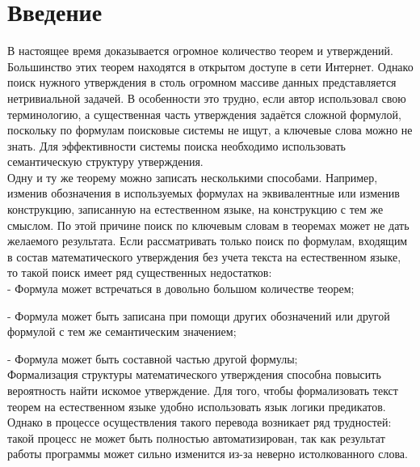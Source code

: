 \documentclass[12pt]{article}
\begin{document}

\newpage
\begin{center}
\tableofcontents \vspace{3cm}
\end{center}



\newpage

\section*{Введение}
В настоящее время доказывается огромное количество теорем и утверждений. Большинство этих теорем  находятся в открытом доступе в сети Интернет. Однако поиск нужного утверждения в столь огромном массиве данных представляется нетривиальной задачей. В особенности это трудно, если автор использовал свою терминологию, а существенная часть утверждения задаётся сложной формулой, поскольку по формулам поисковые системы не ищут, а ключевые слова можно не знать. Для эффективности системы поиска необходимо использовать семантическую структуру утверждения. \\

Одну и ту же теорему можно записать несколькими способами. Например, изменив обозначения  в используемых формулах на эквивалентные или изменив конструкцию, записанную на естественном языке, на конструкцию с тем же смыслом. По этой причине поиск по ключевым словам в теоремах может не дать желаемого результата. Если рассматривать только поиск по формулам, входящим в состав математического утверждения без учета текста на естественном языке, то такой поиск имеет ряд существенных недостатков: \\

- Формула может встречаться в довольно большом количестве теорем;

- Формула может быть записана при помощи других обозначений или другой формулой с тем же семантическим значением;

- Формула может быть составной частью другой формулы;\\

Формализация структуры математического утверждения способна повысить вероятность найти искомое утверждение. Для того, чтобы формализовать текст теорем на естественном языке удобно использовать язык логики предикатов. Однако в процессе осуществления такого перевода возникает ряд трудностей: такой процесс не может быть полностью автоматизирован, так как результат работы программы может сильно изменится из-за неверно истолкованного слова. \\
\end{document}
